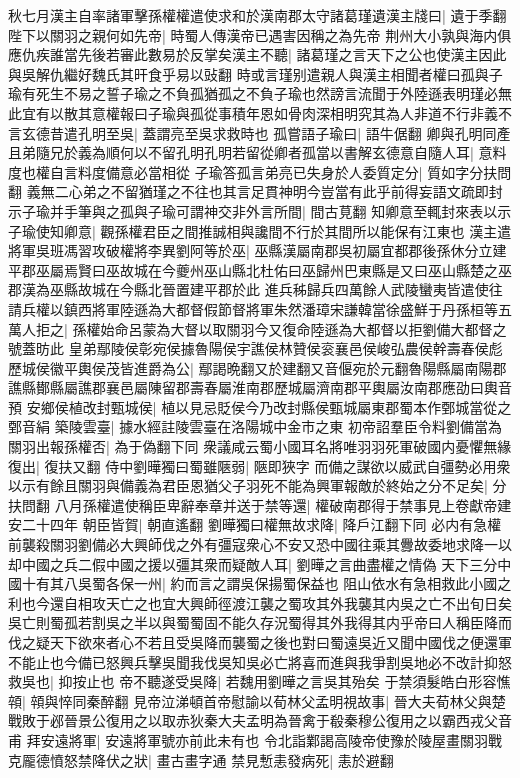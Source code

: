 秋七月漢主自率諸軍擊孫權權遣使求和於漢南郡太守諸葛瑾遺漢主牋曰|{
	遺于季翻}
陛下以關羽之親何如先帝|{
	時蜀人傳漢帝已遇害因稱之為先帝}
荆州大小孰與海内俱應仇疾誰當先後若審此數易於反掌矣漢主不聽|{
	諸葛瑾之言天下之公也使漢主因此與吳解仇繼好魏氏其旰食乎易以䜴翻}
時或言瑾别遣親人與漢主相聞者權曰孤與子瑜有死生不易之誓子瑜之不負孤猶孤之不負子瑜也然謗言流聞于外陸遜表明瑾必無此宜有以散其意權報曰子瑜與孤從事積年恩如骨肉深相明究其為人非道不行非義不言玄德昔遣孔明至吳|{
	蓋謂亮至吳求救時也}
孤嘗語子瑜曰|{
	語牛倨翻}
卿與孔明同產且弟隨兄於義為順何以不留孔明孔明若留從卿者孤當以書解玄德意自隨人耳|{
	意料度也權自言料度備意必當相從}
子瑜答孤言弟亮已失身於人委質定分|{
	質如字分扶問翻}
義無二心弟之不留猶瑾之不往也其言足貫神明今豈當有此乎前得妄語文疏即封示子瑜并手筆與之孤與子瑜可謂神交非外言所間|{
	間古莧翻}
知卿意至輒封來表以示子瑜使知卿意|{
	觀孫權君臣之間推誠相與讒間不行於其間所以能保有江東也}
漢主遣將軍吳班馮習攻破權將李異劉阿等於巫|{
	巫縣漢屬南郡吳初屬宜都郡後孫休分立建平郡巫屬焉賢曰巫故城在今夔州巫山縣北杜佑曰巫歸州巴東縣是又曰巫山縣楚之巫郡漢為巫縣故城在今縣北晉置建平郡於此}
進兵秭歸兵四萬餘人武陵蠻夷皆遣使往請兵權以鎮西將軍陸遜為大都督假節督將軍朱然潘璋宋謙韓當徐盛鮮于丹孫桓等五萬人拒之|{
	孫權始命呂蒙為大督以取關羽今又復命陸遜為大都督以拒劉備大都督之號蓋昉此}
皇弟鄢陵侯彰宛侯據魯陽侯宇譙侯林贊侯衮襄邑侯峻弘農侯幹壽春侯彪歷城侯徽平輿侯茂皆進爵為公|{
	鄢謁晩翻又於建翻又音偃宛於元翻魯陽縣屬南陽郡譙縣鄼縣屬譙郡襄邑屬陳留郡壽春屬淮南郡歷城屬濟南郡平輿屬汝南郡應劭曰輿音預}
安鄉侯植改封甄城侯|{
	植以見忌貶侯今乃改封縣侯甄城屬東郡蜀本作鄄城當從之鄄音絹}
築陵雲臺|{
	據水經註陵雲臺在洛陽城中金市之東}
初帝詔羣臣令料劉備當為關羽出報孫權否|{
	為于偽翻下同}
衆議咸云蜀小國耳名將唯羽羽死軍破國内憂懼無緣復出|{
	復扶又翻}
侍中劉曄獨曰蜀雖陿弱|{
	陿即狹字}
而備之謀欲以威武自彊勢必用衆以示有餘且關羽與備義為君臣恩猶父子羽死不能為興軍報敵於終始之分不足矣|{
	分扶問翻}
八月孫權遣使稱臣卑辭奉章并送于禁等還|{
	權破南郡得于禁事見上卷獻帝建安二十四年}
朝臣皆賀|{
	朝直遙翻}
劉曄獨曰權無故求降|{
	降戶江翻下同}
必内有急權前襲殺關羽劉備必大興師伐之外有彊寇衆心不安又恐中國往乘其釁故委地求降一以却中國之兵二假中國之援以彊其衆而疑敵人耳|{
	劉曄之言曲盡權之情偽}
天下三分中國十有其八吳蜀各保一州|{
	約而言之謂吳保揚蜀保益也}
阻山依水有急相救此小國之利也今還自相攻天亡之也宜大興師徑渡江襲之蜀攻其外我襲其内吳之亡不出旬日矣吳亡則蜀孤若割吳之半以與蜀蜀固不能久存況蜀得其外我得其内乎帝曰人稱臣降而伐之疑天下欲來者心不若且受吳降而襲蜀之後也對曰蜀遠吳近又聞中國伐之便還軍不能止也今備已怒興兵擊吳聞我伐吳知吳必亡將喜而進與我爭割吳地必不改計抑怒救吳也|{
	抑按止也}
帝不聽遂受吳降|{
	若魏用劉曄之言吳其殆矣}
于禁須髮皓白形容憔顇|{
	顇與悴同秦醉翻}
見帝泣涕頓首帝慰諭以荀林父孟明視故事|{
	晉大夫荀林父與楚戰敗于邲晉景公復用之以取赤狄秦大夫孟明為晉禽于殽秦穆公復用之以霸西戎父音甫}
拜安遠將軍|{
	安遠將軍號亦前此未有也}
令北詣鄴謁高陵帝使豫於陵屋畫關羽戰克龎德憤怒禁降伏之狀|{
	畫古畫字通}
禁見慙恚發病死|{
	恚於避翻}


